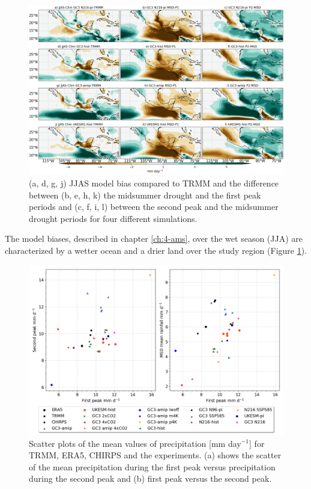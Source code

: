 \begin{figure}[t!]
\includegraphics[width=\linewidth]{figures/fig2obs_prmodels3.png}
\caption{ (a, d, g, j) JJAS model bias compared to TRMM and the difference between  (b, e, h, k)  the midsummer drought and the first peak periods and (c, f, i, l)  between the second peak and the midsummer drought periods for four different simulations.}
\label{fig:model_pr}
\end{figure} 
 
The model biases, described in chapter \ref{ch:4-ams}, over the wet season (JJA) are characterized by a wetter ocean and a drier land over the study region (Figure \ref{fig:model_pr}). 
 
\label{sq:msdclim}
 \begin{figure}[t!]
\includegraphics[width=\linewidth]{figures/dumscatter_2.png}
\caption{Scatter plots of the mean values of precipitation [mm day$^{-1}$] for TRMM, ERA5, CHIRPS and the experiments. (a) shows the scatter of the mean precipitation during the first peak versus precipitation during the second peak and (b) first peak versus the second peak.  }
\label{fig:scatter_msd}
\end{figure} 


